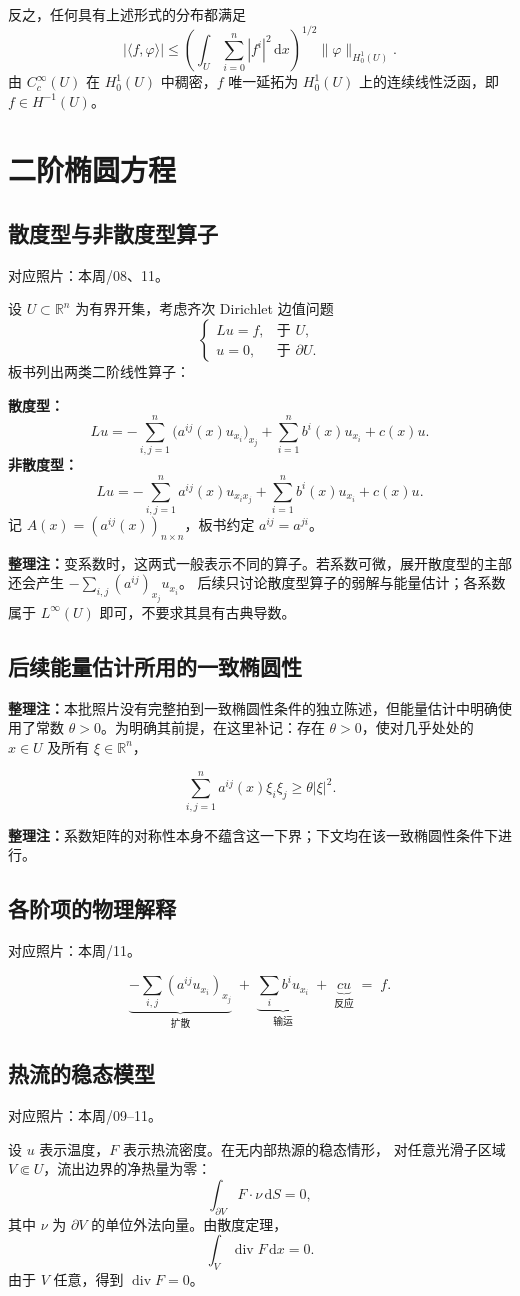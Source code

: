\documentclass[UTF8,a4paper,11pt,fontset=fandol]{ctexart}
\newcommand{\R}{\mathbb R}
\newcommand{\dd}{\,\mathrm d}
\newcommand{\ednote}[1]{\par{\small\color{notegray}\textbf{整理注：}#1}\par}
\newcommand{\source}[1]{{\small\color{notegray}对应照片：#1。}\par}
\begin{document}
反之，任何具有上述形式的分布都满足
\[
|\langle f,\varphi\rangle|
\leq\left(\int_U\sum_{i=0}^n|f^i|^2\dd x\right)^{1/2}
\|\varphi\|_{H_0^1(U)}.
\]
由 $C_c^\infty(U)$ 在 $H_0^1(U)$ 中稠密，$f$ 唯一延拓为
$H_0^1(U)$ 上的连续线性泛函，即 $f\in H^{-1}(U)$。

\newpage
\section{二阶椭圆方程}
\subsection{散度型与非散度型算子}
\source{本周/08、11}
设 $U\subset\R^n$ 为有界开集，考虑齐次 Dirichlet 边值问题
\[
\begin{cases}
Lu=f,&\text{于 }U,\\
u=0,&\text{于 }\partial U.
\end{cases}
\]
板书列出两类二阶线性算子：

\textbf{散度型：}
\[
\boxed{Lu=-\sum_{i,j=1}^n\bigl(a^{ij}(x)u_{x_i}\bigr)_{x_j}
       +\sum_{i=1}^nb^i(x)u_{x_i}+c(x)u.}
\]
\textbf{非散度型：}
\[
\boxed{Lu=-\sum_{i,j=1}^na^{ij}(x)u_{x_ix_j}
       +\sum_{i=1}^nb^i(x)u_{x_i}+c(x)u.}
\]
记 $A(x)=(a^{ij}(x))_{n\times n}$，板书约定 $a^{ij}=a^{ji}$。
\ednote{变系数时，这两式一般表示不同的算子。若系数可微，展开散度型的主部还会产生
$-\sum_{i,j}(a^{ij})_{x_j}u_{x_i}$。
后续只讨论散度型算子的弱解与能量估计；各系数属于 $L^\infty(U)$ 即可，不要求其具有古典导数。}

\subsection*{后续能量估计所用的一致椭圆性}
\ednote{本批照片没有完整拍到一致椭圆性条件的独立陈述，但能量估计中明确使用了常数
$\theta>0$。为明确其前提，在这里补记：存在 $\theta>0$，使对几乎处处的 $x\in U$ 及所有
$\xi\in\R^n$，}
\[
\boxed{\sum_{i,j=1}^na^{ij}(x)\xi_i\xi_j\geq\theta|\xi|^2.}
\]
\ednote{系数矩阵的对称性本身不蕴含这一下界；下文均在该一致椭圆性条件下进行。}

\subsection*{各阶项的物理解释}
\source{本周/11}
\[
\underbrace{-\sum_{i,j}(a^{ij}u_{x_i})_{x_j}}_{\text{扩散}}
\; +\;
\underbrace{\sum_i b^iu_{x_i}}_{\text{输运}}
\; +\;
\underbrace{cu}_{\text{反应}}
\; =\; f.
\]

\newpage
\subsection{热流的稳态模型}
\source{本周/09--11}
设 $u$ 表示温度，$F$ 表示热流密度。在无内部热源的稳态情形，
对任意光滑子区域 $V\Subset U$，流出边界的净热量为零：
\[
\int_{\partial V}F\cdot\nu\dd S=0,
\]
其中 $\nu$ 为 $\partial V$ 的单位外法向量。由散度定理，
\[
\int_V\operatorname{div}F\dd x=0.
\]
由于 $V$ 任意，得到 $\operatorname{div}F=0$。
\end{document}
